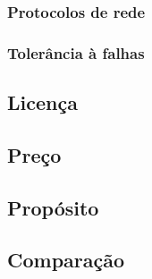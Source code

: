 \subsubsection{Protocolos de rede}

\subsubsection{Tolerância à falhas}

\subsection{Licença}

\subsection{Preço}

\subsection{Propósito}

\subsection{Comparação}